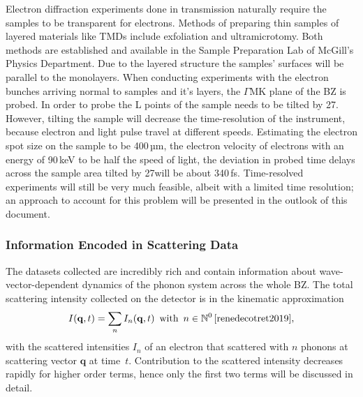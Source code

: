 Electron diffraction experiments done in transmission naturally require the samples to be transparent for electrons.
Methods of preparing thin samples of layered materials like \acp{TMD} include exfoliation\cite{mak2010} and ultramicrotomy\cite{malis1990}.
Both methods are established and available in the Sample Preparation Lab of McGill's Physics Department.
Due to the layered structure the samples' surfaces will be parallel to the monolayers.
When conducting experiments with the electron bunches arriving normal to \ts\space samples and it's layers, the $\Gamma\mathrm{MK}$ plane of the \ac{BZ} is probed.
In order to probe the L points of \ts\space the sample needs to be tilted by 27\textdegree.
However, tilting the sample will decrease the time-resolution of the instrument, because electron and light pulse travel at different speeds.
Estimating the electron spot size on the sample to be 400\,µm, the electron velocity of electrons with an energy of 90\,keV to be half the speed of light, the deviation in probed time delays across the sample area tilted by 27\textdegree will be about 340\,fs.
Time-resolved experiments will still be very much feasible, albeit with a limited time resolution; an approach to account for this problem will be presented in the outlook of this document.

\subsubsection*{Information Encoded in Scattering Data}
The datasets collected are incredibly rich and contain information about wave-vector-dependent dynamics of the phonon system across the whole \ac{BZ}.
The total scattering intensity collected on the detector is in the kinematic approximation
\begin{equation} I(\mathbf{q},t) = \sum_n I_n(\mathbf{q},t)\enspace\text{with}\enspace n \in\mathbb{N}^0\,\label{eq:I}\text{\cite{renedecotret2019}},\end{equation}
with the scattered intensities $I_n$ of an electron that scattered with $n$ phonons at scattering vector $\mathbf{q}$ at time~$t$.
Contribution to the scattered intensity decreases rapidly for higher order terms, hence only the first two terms will be discussed in detail.

